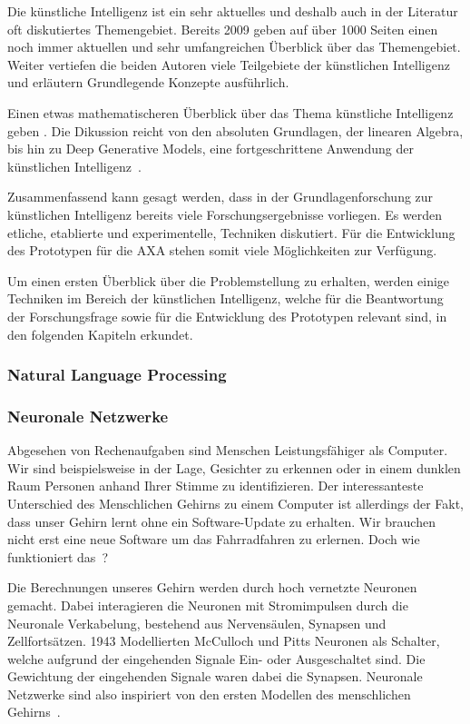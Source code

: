 \documentclass{hwz}
\begin{document}
Die künstliche Intelligenz ist ein sehr aktuelles und deshalb auch in der Literatur oft diskutiertes Themengebiet. Bereits 2009 geben \textcite{Russell2009ArtificialEdition} auf über 1000 Seiten einen noch immer aktuellen und sehr umfangreichen Überblick über das Themengebiet. Weiter vertiefen die beiden Autoren viele Teilgebiete der künstlichen Intelligenz und erläutern Grundlegende Konzepte ausführlich.

Einen etwas mathematischeren Überblick über das Thema künstliche Intelligenz geben \textcite{Goodfellow2016DeepLearning}. Die Dikussion reicht von den absoluten Grundlagen, der linearen Algebra, bis hin zu Deep Generative Models, eine fortgeschrittene Anwendung der künstlichen Intelligenz~\autocite{Goodfellow2016DeepLearning}.

Zusammenfassend kann gesagt werden, dass in der Grundlagenforschung zur künstlichen Intelligenz bereits viele Forschungsergebnisse vorliegen. Es werden etliche, etablierte und experimentelle, Techniken diskutiert. Für die Entwicklung des Prototypen für die AXA stehen somit viele Möglichkeiten zur Verfügung.

Um einen ersten Überblick über die Problemstellung zu erhalten, werden einige Techniken im Bereich der künstlichen Intelligenz, welche für die Beantwortung der Forschungsfrage sowie für die Entwicklung des Prototypen relevant sind, in den folgenden Kapiteln erkundet.

\subsubsection{Natural Language Processing}


\subsubsection{Neuronale Netzwerke}

Abgesehen von Rechenaufgaben sind Menschen Leistungsfähiger als Computer. Wir sind beispielsweise in der Lage, Gesichter zu erkennen oder in einem dunklen Raum Personen anhand Ihrer Stimme zu identifizieren. Der interessanteste Unterschied des Menschlichen Gehirns zu einem Computer ist allerdings der Fakt, dass unser Gehirn lernt ohne ein Software-Update zu erhalten. Wir brauchen nicht erst eine neue Software um das Fahrradfahren zu erlernen. Doch wie funktioniert das~\autocite{Krogh2008WhatNetworks}?

Die Berechnungen unseres Gehirn werden durch hoch vernetzte Neuronen gemacht. Dabei interagieren die Neuronen mit Stromimpulsen durch die Neuronale Verkabelung, bestehend aus Nervensäulen, Synapsen und Zellfortsätzen. 1943 Modellierten McCulloch und Pitts Neuronen als Schalter, welche aufgrund der eingehenden Signale Ein- oder Ausgeschaltet sind. Die Gewichtung der eingehenden Signale waren dabei die Synapsen. Neuronale Netzwerke sind also inspiriert von den ersten Modellen des menschlichen Gehirns~\autocite{Krogh2008WhatNetworks}.
\end{document}
